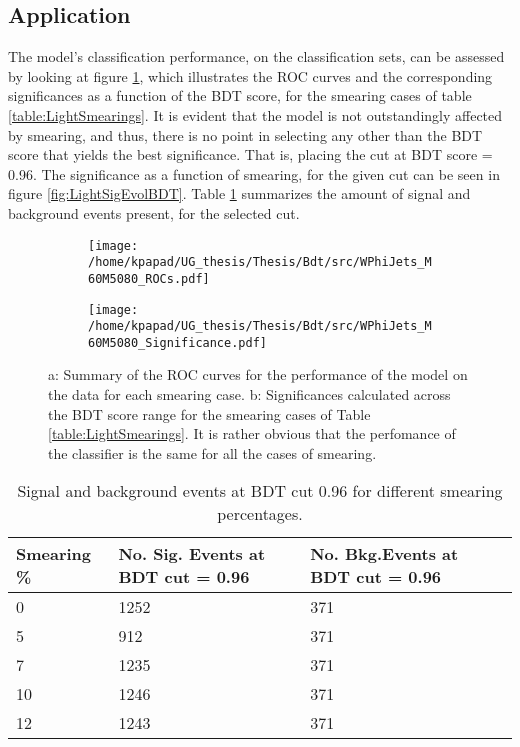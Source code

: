 \subsection{Application}
\label{sec:orgf98812d}
\label{sec:Light_application}
The model's classification performance, on the classification sets, can be assessed by looking at figure \ref{fig:LightROCSIG}, which illustrates the ROC curves and the corresponding significances as a function of the BDT score, for the smearing cases of table \ref{table:LightSmearings}. It is evident that the model is not outstandingly affected by smearing, and thus, there is no point in selecting any other than the BDT score that yields the best significance. That is, placing the cut at BDT score = 0.96. The significance as a function of smearing, for the given cut can be seen in figure \ref{fig:LightSigEvolBDT}. Table \ref{table:LightNumSIGBKG} summarizes the amount of signal and background events present, for the selected cut.
\begin{figure}[h]
\centering
\begin{subfigure}{0.49\textwidth}
\centering
\texttt{[image: /home/kpapad/UG\_thesis/Thesis/Bdt/src/WPhiJets\_M60M5080\_ROCs.pdf]}
\caption{}
\end{subfigure}
\begin{subfigure}{0.49\textwidth}
\centering
\texttt{[image: /home/kpapad/UG\_thesis/Thesis/Bdt/src/WPhiJets\_M60M5080\_Significance.pdf]}
\caption{}
\end{subfigure}
\caption{a: Summary of the ROC curves for the performance of the model on the data for each smearing case. b: Significances calculated across the BDT score range for the smearing cases of Table \ref{table:LightSmearings}. It is rather obvious that the perfomance of the classifier is the same for all the cases of smearing. }
\label{fig:LightROCSIG}
\end{figure}

\begin{table}[ht]
\centering
\begin{tabular}{|p{2cm}|p{3cm}|p{3cm}|}
 \hline
Smearing \%  & No. Sig. Events at BDT cut = 0.96 & No. Bkg.Events at BDT cut = 0.96 \\
\hline
0 & 1252 & 371 \\
5 & 912 & 371 \\
7 & 1235 & 371 \\
10 & 1246 & 371 \\
12 & 1243 & 371 \\
 \hline
\end{tabular}
\caption{Signal and background events at BDT cut 0.96 for different smearing percentages.}
\label{table:LightNumSIGBKG}
\end{table}

